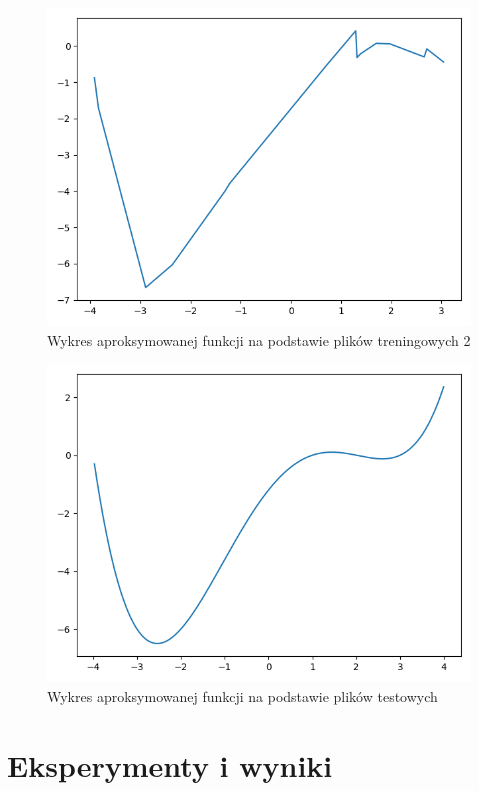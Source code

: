 \documentclass[12pt]{article}
\begin{document}
\begin{figure}[!htb]
 \centering
 \includegraphics[width=12cm]{originalfunc2.png}
 \caption{Wykres aproksymowanej funkcji na podstawie plików treningowych 2}
 \vspace{-0.3cm}
 \label{originalfunc2}
\end{figure}

\begin{figure}[!htb]
 \centering
 \includegraphics[width=12cm]{originalfunc3.png}
 \caption{Wykres aproksymowanej funkcji na podstawie plików testowych}
 \vspace{-0.3cm}
 \label{originalfunc3}
\end{figure}

\newpage
\section{Eksperymenty i wyniki} 
\end{document}
